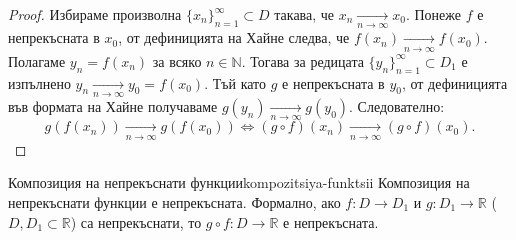 \begin{proof}
Избираме произволна $\{x_n\}_{n=1}^\infty \subset D$ такава, че $x_n \xrightarrow[n \to \infty]{} x_0$. Понеже $f$ е непрекъсната в $x_0$, от дефиницията на Хайне следва, че $f(x_n) \xrightarrow[n \to \infty]{} f(x_0)$. Полагаме $y_n = f(x_n)$ за всяко $n \in \mathbb{N}$. Тогава за редицата $\{y_n\}_{n=1}^\infty \subset D_1$ е изпълнено $y_n \xrightarrow[n \to \infty]{} y_0 = f(x_0)$. Тъй като $g$ е непрекъсната в $y_0$, от дефиницията във формата на Хайне получаваме $g(y_n) \xrightarrow[n \to \infty]{} g(y_0)$. Следователно:
\[
g(f(x_n)) \xrightarrow[n \to \infty]{} g(f(x_0)) \iff (g \circ f)(x_n) \xrightarrow[n \to \infty]{} (g \circ f)(x_0).
\]
\end{proof}

\begin{corollary}{Композиция на непрекъснати функции}{kompozitsiya-funktsii}
Композиция на непрекъснати функции е непрекъсната. Формално, ако $f : D \to D_1$ и $g : D_1 \to \mathbb{R}$ ($D, D_1 \subset \mathbb{R}$) са непрекъснати, то $g \circ f : D \to \mathbb{R}$ е непрекъсната.
\end{corollary}

